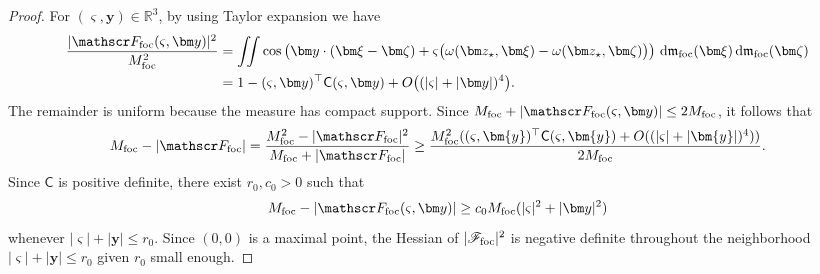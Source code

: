 \documentclass[11pt,reqno]{amsart}
\newcommand{\dd}{\,\mathrm{d}}
\numberwithin{equation}{section}
\begin{document}
\begin{proof}
For $(\varsigma,\bm y)\in\mathbb R^3$, by using Taylor expansion we have
\begin{equation*}
 \begin{aligned}
 \frac{|\mathscr F_{\rm foc}(\varsigma,\bm y)|^2}{M_{\rm foc}^2}
 &=\iint\cos\left(\bm y\cdot(\bm\xi-\bm\zeta)+\varsigma\bigl(\omega(\bm z_\star,\bm\xi)-\omega(\bm z_\star,\bm\zeta)\bigr)\right)\dd\mathfrak m_{\rm foc}(\bm\xi)\dd\mathfrak m_{\rm foc}(\bm\zeta)\\
 &=1-(\varsigma,\bm y)^{\top}\mathsf C(\varsigma,\bm y)+O\bigl((|\varsigma|+|\bm y|)^4\bigr).
 \end{aligned}
\end{equation*}
The remainder is uniform because the measure has compact support. Since $M_{\rm foc}+|\mathscr F_{\rm foc}(\varsigma,\bm y)|\le2M_{\rm foc}$, it follows that
\begin{align*}
    M_{\rm foc}-|\mathscr F_{\rm foc}| = \frac{M_{\rm foc}^2-|\mathscr F_{\rm foc}|^2}{M_{\rm foc}+|\mathscr F_{\rm foc}|} \geq \frac{M_{\rm foc}^2((\varsigma,\bm{y})^\top\mathsf C(\varsigma,\bm{y})+O((|\varsigma|+|\bm{y}|)^4))}{2M_{\rm foc}}.
\end{align*}
Since $\mathsf C$ is positive definite, there exist $r_0,c_0>0$ such that
\begin{equation*}
 M_{\rm foc}-|\mathscr F_{\rm foc}(\varsigma,\bm y)|\ge c_0M_{\rm foc}(|\varsigma|^2+|\bm y|^2)
\end{equation*}
whenever $|\varsigma|+|\bm y|\le r_0$. Since $(0,0)$ is a maximal point, the Hessian of $|\mathscr F_{\rm foc}|^2$ is negative definite throughout the neighborhood $|\varsigma|+|\bm y|\leq r_0$ given $r_0$ small enough.


\end{proof}
\end{document}
